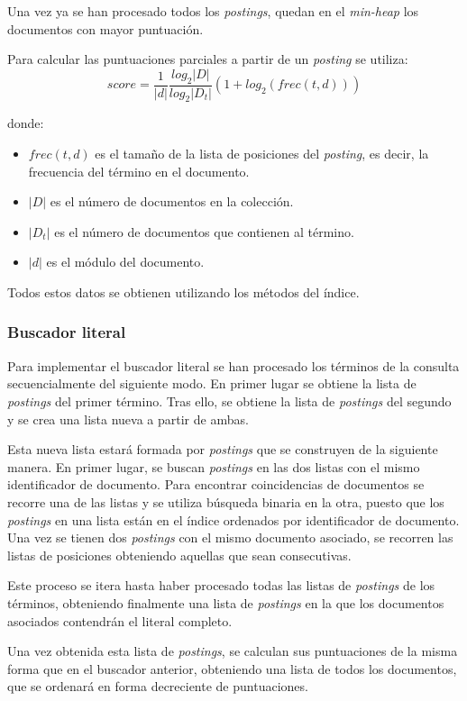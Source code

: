 \documentclass[spanish]{assignment}
\begin{document}
	Una vez ya se han procesado todos los \textit{postings}, quedan en el \textit{min-heap} los documentos con mayor puntuación.
	
	Para calcular las puntuaciones parciales a partir de un \textit{posting} se utiliza:
	$$score = \frac{1}{|d|}\frac{log_2|D|}{log_2|D_t|}\left(1 + log_2(frec(t,d))\right)$$

	donde:
	\begin{itemize}
		\item $frec(t,d)$ es el tamaño de la lista de posiciones del \textit{posting}, es decir, la frecuencia del término en el documento.
		\item $|D|$ es el número de documentos en la colección.
		\item $|D_t|$ es el número de documentos que contienen al término.
		\item $|d|$ es el módulo del documento.
	\end{itemize}
	Todos estos datos se obtienen utilizando los métodos del índice.
	
	\subsubsection{Buscador literal}
	Para implementar el buscador literal se han procesado los términos de la consulta secuencialmente del siguiente modo. En primer lugar se obtiene la lista de \textit{postings} del primer término. Tras ello, se obtiene la lista de \textit{postings} del segundo y se crea una lista nueva a partir de ambas.
	
	Esta nueva lista estará formada por \textit{postings} que se construyen de la siguiente manera. En primer lugar, se buscan \textit{postings} en las dos listas con el mismo identificador de documento. Para encontrar coincidencias de documentos se recorre una de las listas y se utiliza búsqueda binaria en la otra, puesto que los \textit{postings} en una lista están en el índice ordenados por identificador de documento. Una vez se tienen dos \textit{postings} con el mismo documento asociado, se recorren las listas de posiciones obteniendo aquellas que sean consecutivas.
	
	Este proceso se itera hasta haber procesado todas las listas de \textit{postings} de los términos, obteniendo finalmente una lista de \textit{postings} en la que los documentos asociados contendrán el literal completo.
	
	Una vez obtenida esta lista de \textit{postings}, se calculan sus puntuaciones de la misma forma que en el buscador anterior, obteniendo una lista de todos los documentos, que se ordenará en forma decreciente de puntuaciones.
\end{document}
